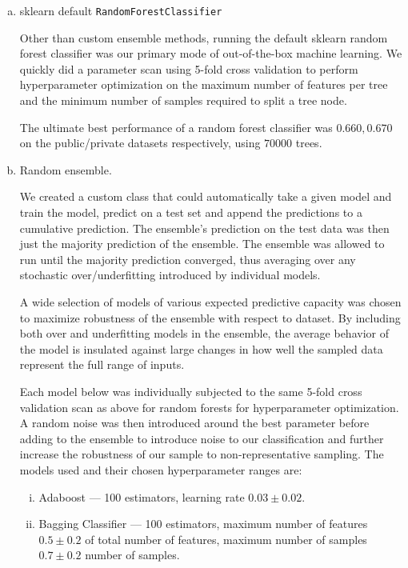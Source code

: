 \documentclass[10pt, preprint2]{aastex}
\begin{document}
\begin{enumerate}[a)]
    \item sklearn default \texttt{RandomForestClassifier}

        Other than custom ensemble methods, running the default sklearn random forest classifier was our primary mode of out-of-the-box machine learning. We quickly did a parameter scan using 5-fold cross validation to perform hyperparameter optimization on the maximum number of features per tree and the minimum number of samples required to split a tree node.

        The ultimate best performance of a random forest classifier was $0.660, 0.670$ on the public/private datasets respectively, using $70000$ trees.
    \item Random ensemble.

        We created a custom class that could automatically take a given model and train the model, predict on a test set and append the predictions to a cumulative prediction. The ensemble's prediction on the test data was then just the majority prediction of the ensemble. The ensemble was allowed to run until the majority prediction converged, thus averaging over any stochastic over/underfitting introduced by individual models.

        A wide selection of models of various expected predictive capacity was chosen to maximize robustness of the ensemble with respect to dataset. By including both over and underfitting models in the ensemble, the average behavior of the model is insulated against large changes in how well the sampled data represent the full range of inputs. 
        
        Each model below was individually subjected to the same 5-fold cross validation scan as above for random forests for hyperparameter optimization. A random noise was then introduced around the best parameter before adding to the ensemble to introduce noise to our classification and further increase the robustness of our sample to non-representative sampling. The models used and their chosen hyperparameter ranges are:
        \begin{enumerate}[i.]
            \item Adaboost --- 100 estimators, learning rate $0.03 \pm 0.02$.

            \item Bagging Classifier --- 100 estimators, maximum number of features $0.5 \pm 0.2$ of total number of features, maximum number of samples $0.7 \pm 0.2$ number of samples.


\end{enumerate}
\end{enumerate}
\end{document}
